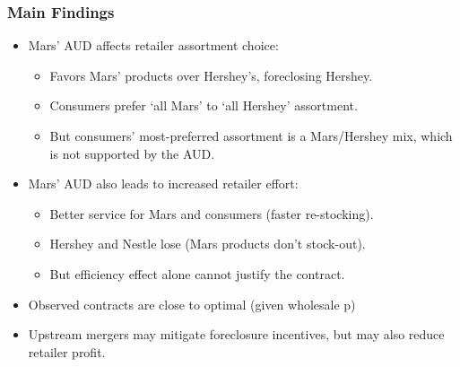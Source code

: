 \documentclass[aspectratio=169]{beamer}
\begin{document}
\begin{frame}\frametitle{Main Findings}
\begin{itemize}
\item Mars' AUD affects retailer assortment choice:
	\begin{itemize}
	\item Favors Mars' products over Hershey's, foreclosing Hershey.
	\item Consumers prefer `all Mars' to `all Hershey' assortment.
	\item But consumers' most-preferred assortment is a Mars/Hershey mix, which is not supported by the AUD.
	\end{itemize}
\item Mars' AUD also leads to increased retailer effort:
\begin{itemize}
\item Better service for Mars and consumers (faster re-stocking).
\item Hershey and Nestle lose (Mars products don't stock-out).
\item But efficiency effect alone cannot justify the contract.
\end{itemize}
\item Observed contracts are close to optimal (given wholesale p)
\item Upstream mergers may mitigate foreclosure incentives, but may also reduce retailer profit.
\end{itemize}
\end{frame}
\end{document}
